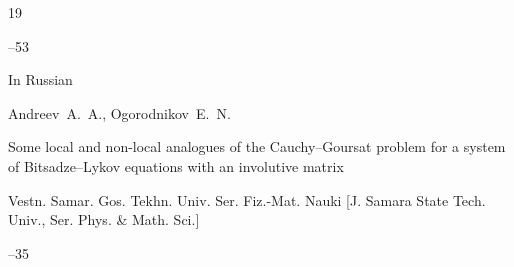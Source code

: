 \begin{thebibliography}{19}


--53





\lang In Russian

\by Andreev~A.~A., Ogorodnikov~E.~N.

\paper Some local and non-local analogues of the Cauchy–Goursat problem for a system of Bitsadze–Lykov equations with an involutive matrix 

\jour  Vestn. Samar. Gos. Tekhn. Univ. Ser. Fiz.-Mat. Nauki \rm [J. Samara State Tech. Univ., Ser. Phys. \& Math. Sci.]



--35




\end{thebibliography}





\EngDate



\smallskip





\newpage

\Russian




%

